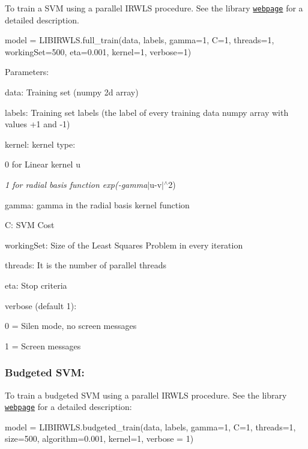 To train a S\+VM using a parallel I\+R\+W\+LS procedure. See the library \href{https://robedm.github.io/LIBIRWLS/}{\tt webpage} for a detailed description.

\begin{DoxyVerb}model = LIBIRWLS.full_train(data, labels, gamma=1, C=1, threads=1, workingSet=500, eta=0.001, kernel=1, verbose=1)
\end{DoxyVerb}


Parameters\+:
\begin{DoxyItemize}
\item data\+: Training set (numpy 2d array)
\item labels\+: Training set labels (the label of every training data numpy array with values +1 and -\/1)
\item kernel\+: kernel type\+:
\begin{DoxyItemize}
\item 0 for Linear kernel u
\item {\itshape 1 for radial basis function exp(-\/gamma}$\vert$u-\/v$\vert$$^\wedge$2)
\end{DoxyItemize}
\item gamma\+: gamma in the radial basis kernel function
\item C\+: S\+VM Cost
\item working\+Set\+: Size of the Least Squares Problem in every iteration
\item threads\+: It is the number of parallel threads
\item eta\+: Stop criteria
\item verbose (default 1)\+:
\begin{DoxyItemize}
\item 0 = Silen mode, no screen messages
\item 1 = Screen messages
\end{DoxyItemize}
\end{DoxyItemize}

\subsubsection*{Budgeted S\+VM\+:}

To train a budgeted S\+VM using a parallel I\+R\+W\+LS procedure. See the library \href{https://robedm.github.io/LIBIRWLS/}{\tt webpage} for a detailed description\+: \begin{DoxyVerb}    model = LIBIRWLS.budgeted_train(data, labels, gamma=1, C=1, threads=1, size=500, algorithm=0.001, kernel=1, verbose = 1)
\end{DoxyVerb}



